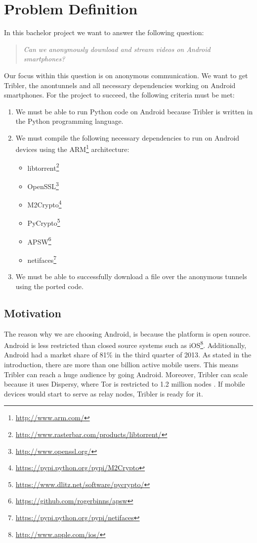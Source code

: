 \chapter{Problem Definition}
\label{cpt:problemdefinition}

In this bachelor project we want to answer the following question:

\begin{quote}
\emph{Can we anonymously download and stream videos on Android smartphones?}
\end{quote}

Our focus within this question is on anonymous communication. We want to get Tribler, the anontunnels and all necessary dependencies working on Android smartphones. For the project to succeed, the following criteria must be met:
\begin{enumerate}
\item We must be able to run Python code on Android because Tribler is written in the Python programming language.
\item We must compile the following necessary dependencies to run on Android devices using the ARM\footnote{\url{http://www.arm.com/}} architecture:
\begin{itemize}
\item libtorrent\footnote{\url{http://www.rasterbar.com/products/libtorrent/}}
\item OpenSSL\footnote{\url{http://www.openssl.org/}}
\item M2Crypto\footnote{\url{https://pypi.python.org/pypi/M2Crypto}}
\item PyCrypto\footnote{\url{https://www.dlitz.net/software/pycrypto/}}
\item APSW\footnote{\url{https://github.com/rogerbinns/apsw}}
\item netifaces\footnote{\url{https://pypi.python.org/pypi/netifaces}}
\end{itemize}
\item We must be able to successfully download a file over the anonymous tunnels using the ported code.
\end{enumerate}

	\section{Motivation}
	\label{sec:motivation}
		The reason why we are choosing Android, is because the platform is open source. Android is less restricted than closed source systems such as iOS\footnote{\url{http://www.apple.com/ios/}}. Additionally, Android had a market share of 81\% in the third quarter of 2013\cite{forbesandroidmarket}. As stated in the introduction, there are more than one billion active mobile users. This means Tribler can reach a huge audience by going Android. Moreover, Tribler can scale because it uses Dispersy, where Tor is restricted to 1.2 million nodes \cite{mclachlan2009scalable}. If mobile devices would start to serve as relay nodes, Tribler is ready for it.
		
